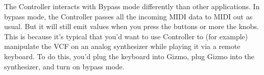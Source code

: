 \documentclass{article}
\begin{document}
The Controller interacts with Bypass mode differently than other applications.  In bypass mode, the Controller passes all the incoming MIDI data to MIDI out as usual.  But it will still emit values when you press the buttons or more the knobs.  This is because it's typical that you'd want to use Controller to (for example) manipulate the VCF on an analog synthesizer while playing it via a remote keyboard.  To do this, you'd plug the keyboard into Gizmo, plug Gizmo into the synthesizer, and turn on bypass mode.

\end{document}
